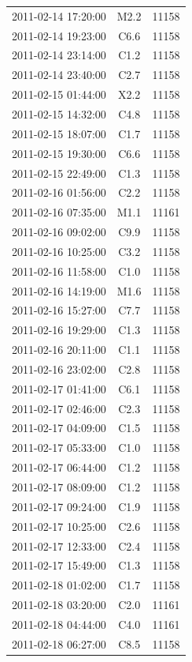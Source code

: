 \documentclass[referee,a4paper,12pt]{swsc}
\begin{document}
\begin{linenumbers}
\begin{longtable}{c|c|c}
		2011-02-14 17:20:00 & M2.2 & 11158 \\ 
		2011-02-14 19:23:00 & C6.6 & 11158 \\ 
		2011-02-14 23:14:00 & C1.2 & 11158 \\ 
		2011-02-14 23:40:00 & C2.7 & 11158 \\ 
		2011-02-15 01:44:00 & X2.2 & 11158 \\ 
		2011-02-15 14:32:00 & C4.8 & 11158 \\ 
		2011-02-15 18:07:00 & C1.7 & 11158 \\ 
		2011-02-15 19:30:00 & C6.6 & 11158 \\ 
		2011-02-15 22:49:00 & C1.3 & 11158 \\ 
		2011-02-16 01:56:00 & C2.2 & 11158 \\ 
		2011-02-16 07:35:00 & M1.1 & 11161 \\ 
		2011-02-16 09:02:00 & C9.9 & 11158 \\ 
		2011-02-16 10:25:00 & C3.2 & 11158 \\ 
		2011-02-16 11:58:00 & C1.0 & 11158 \\ 
		2011-02-16 14:19:00 & M1.6 & 11158 \\ 
		2011-02-16 15:27:00 & C7.7 & 11158 \\ 
		2011-02-16 19:29:00 & C1.3 & 11158 \\ 
		2011-02-16 20:11:00 & C1.1 & 11158 \\ 
		2011-02-16 23:02:00 & C2.8 & 11158 \\ 
		2011-02-17 01:41:00 & C6.1 & 11158 \\ 
		2011-02-17 02:46:00 & C2.3 & 11158 \\ 
		2011-02-17 04:09:00 & C1.5 & 11158 \\ 
		2011-02-17 05:33:00 & C1.0 & 11158 \\ 
		2011-02-17 06:44:00 & C1.2 & 11158 \\ 
		2011-02-17 08:09:00 & C1.2 & 11158 \\ 
		2011-02-17 09:24:00 & C1.9 & 11158 \\ 
		2011-02-17 10:25:00 & C2.6 & 11158 \\ 
		2011-02-17 12:33:00 & C2.4 & 11158 \\ 
		2011-02-17 15:49:00 & C1.3 & 11158 \\ 
		2011-02-18 01:02:00 & C1.7 & 11158 \\ 
		2011-02-18 03:20:00 & C2.0 & 11161 \\ 
		2011-02-18 04:44:00 & C4.0 & 11161 \\ 
		2011-02-18 06:27:00 & C8.5 & 11158 \\ 

\end{longtable}
\end{linenumbers}
\end{document}
